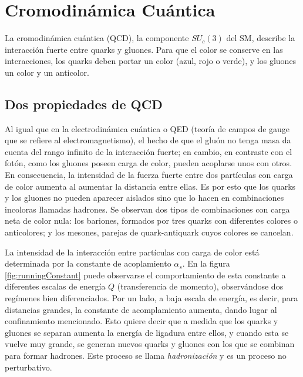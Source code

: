 \section{Cromodinámica Cuántica}\label{QCD}
La cromodinámica cuántica (QCD), la componente $SU_c(3)$ del SM, describe la interacción fuerte entre quarks y gluones. Para que el color se conserve en las interacciones, los quarks deben portar un color (azul, rojo o verde), y los gluones un color y un anticolor.

\subsection{Dos propiedades de QCD}

 Al igual que en la electrodinámica cuántica o QED (teoría de campos de gauge que se refiere al electromagnetismo), el hecho de que el gluón no tenga masa da cuenta del rango infinito de la interacción fuerte; en cambio, en contraste con el fotón, como los gluones poseen carga de color, pueden acoplarse unos con otros. En consecuencia, la intensidad de la fuerza fuerte entre dos partículas con carga de color aumenta al aumentar la distancia entre ellas. Es por esto que los quarks y los gluones no pueden aparecer aislados sino que lo hacen en combinaciones incoloras llamadas hadrones. Se observan dos tipos de combinaciones con carga neta de color nula: los bariones, formados por tres quarks con diferentes colores o anticolores; y los mesones, parejas de quark-antiquark cuyos colores se cancelan\cite{Gaillard}.

La intensidad de la interacción entre partículas con carga de color está determinada por la constante de acoplamiento $\alpha_s$. En la figura \ref{fig:runningConstant} puede observarse el comportamiento de esta constante a diferentes escalas de energía $Q$ (transferencia de momento), observándose dos regímenes bien diferenciados. Por un lado, a baja escala de energía, es decir, para distancias grandes, la constante de acomplamiento aumenta, dando lugar al confinamiento mencionado.  Esto quiere decir que a medida que los quarks y gluones se separan aumenta la energía de ligadura entre ellos, y cuando esta se vuelve muy grande, se generan nuevos quarks y gluones con los que se combinan para formar hadrones. Este proceso se llama \emph{hadronización} y es un proceso no perturbativo. 

